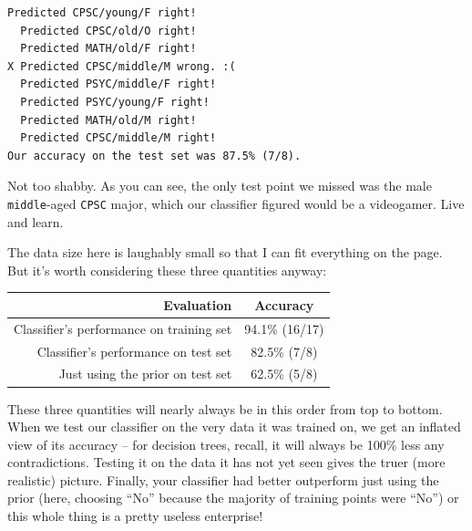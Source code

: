 \begin{Verbatim}[fontsize=\footnotesize,samepage=true,frame=leftline,framesep=5mm,framerule=1mm]
  Predicted CPSC/young/F right!
  Predicted CPSC/old/O right!
  Predicted MATH/old/F right!
X Predicted CPSC/middle/M wrong. :(
  Predicted PSYC/middle/F right!
  Predicted PSYC/young/F right!
  Predicted MATH/old/M right!
  Predicted CPSC/middle/M right!
Our accuracy on the test set was 87.5% (7/8).
\end{Verbatim}

Not too shabby. As you can see, the only test point we missed was the male
\texttt{middle}-aged \texttt{CPSC} major, which our classifier figured would
be a videogamer. Live and learn.

The data size here is laughably small so that I can fit everything on the page.
But it's worth considering these three quantities anyway:

\begin{center}
\begingroup
\par\tagpdfparaOff
{}
\begin{tabular}{r|c}
Evaluation & Accuracy \\
\hline
Classifier's performance on training set & 94.1\% (16/17) \\
\hline
Classifier's performance on test set & 82.5\% (7/8) \\
\hline
Just using the prior on test set & 62.5\% (5/8) \\
\end{tabular}\par
\endgroup
\end{center}


These three quantities will nearly always be in this order from top to bottom.
When we test our classifier on the very data it was trained on, we get an
inflated view of its accuracy -- for decision trees, recall, it will always be
100\% less any contradictions. Testing it on the data it has not yet seen gives
the truer (more realistic) picture. Finally, your classifier had better
outperform just using the prior (here, choosing ``No'' because the majority of
training points were ``No'') or this whole thing is a pretty useless
enterprise!
